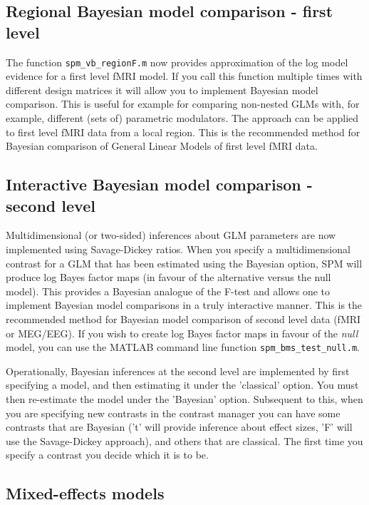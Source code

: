 \documentclass[a4paper,titlepage,openany]{article}
\begin{document}
\subsection{Regional Bayesian model comparison - first level}

The function \texttt{spm\_vb\_regionF.m} now provides approximation of the log model evidence for a first level fMRI model. If you call this function multiple times with different design matrices it will allow you to implement Bayesian model comparison. This is useful for example for comparing non-nested GLMs with, for example, different (sets of) parametric modulators. The approach can be applied to first level fMRI data from a local region. This is the recommended method for Bayesian comparison of General Linear Models of first level fMRI data.

\subsection{Interactive Bayesian model comparison - second level}

Multidimensional (or two-sided) inferences about GLM parameters  are now implemented using Savage-Dickey ratios.  When you specify a multidimensional contrast for a GLM that has been estimated using the Bayesian option, SPM will produce log Bayes factor maps (in favour of the alternative versus the null model). This provides a Bayesian analogue of the F-test and allows one to implement Bayesian model comparisons in a truly interactive manner.
This is the recommended method for Bayesian model comparison of second level data (fMRI or MEG/EEG). If you wish to create log Bayes factor maps in favour of the {\em null} model, you can use the MATLAB command line function \texttt{spm\_bms\_test\_null.m}.

Operationally, Bayesian inferences at the second level are implemented by first specifying a model, and then estimating it under the 'classical' option. You must then re-estimate the model under the 'Bayesian' option. Subsequent to this, when you are specifying new contrasts in the contrast manager you can have some contrasts that are Bayesian ('t' will provide inference about effect sizes, 'F' will use the Savage-Dickey approach), and others that are classical. The first time you specify a contrast you decide which it is to be.

\subsection{Mixed-effects models}
\end{document}
